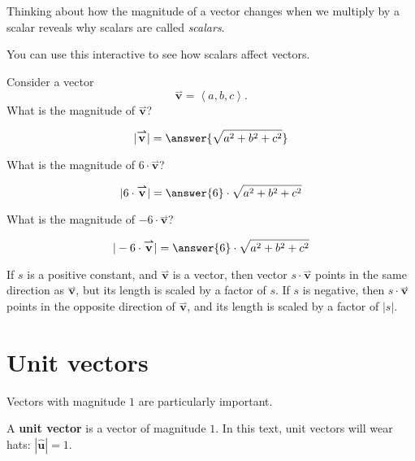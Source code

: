 \documentclass{ximera}
\renewcommand{\vec}[1]{{\overset{\boldsymbol{\rightharpoonup}}{\mathbf{#1}}}}
\newcommand{\uvec}[1]{\mathbf{\hat{#1}}}
\renewcommand{\vector}[1]{\left\langle #1\right\rangle}
\begin{document}
Thinking about how the magnitude of a vector changes when we multiply by a scalar 
reveals why scalars are called \textit{scalars}.

\begin{onlineOnly}
  You can use this interactive to see how scalars affect vectors.
  \begin{center}
  \end{center}
\end{onlineOnly}

\begin{question}
  Consider a vector
  \[
  \vec{v} = \vector{a,b,c}.
  \]
  What is the magnitude of $\vec{v}$?
  \begin{prompt}
    \[
    |\vec{v}| = \answer{\sqrt{a^2+b^2+c^2}}
    \]
  \end{prompt}
  \begin{question}
    What is the magnitude of $6\cdot\vec{v}$?
    \begin{prompt}
      \[
      |6\cdot\vec{v}| = \answer{6}\cdot\sqrt{a^2+b^2+c^2}
      \]
    \end{prompt}
    \begin{question}
    What is the magnitude of $-6\cdot\vec{v}$?
    \begin{prompt}
      \[
      |-6\cdot\vec{v}| = \answer{6}\cdot\sqrt{a^2+b^2+c^2}
      \]
    \end{prompt}
    \begin{feedback}
      If $s$ is a positive constant, and $\vec{v}$ is a vector, then
      vector $s\cdot\vec{v}$ points in the same direction as
      $\vec{v}$, but its length is scaled by a factor of $s$.  If $s$
      is negative, then $s\cdot\vec{v}$ points in the opposite
      direction of $\vec{v}$, and its length is scaled by a factor of
      $|s|$.
    \end{feedback}
  \end{question}
  \end{question}
\end{question}


\section{Unit vectors}

Vectors with magnitude $1$ are particularly important.

\begin{definition}
  A \textbf{unit vector} is a vector of magnitude $1$. In this text, unit
  vectors will wear hats: $|\uvec{u}|=1$.
\end{definition}
\end{document}
